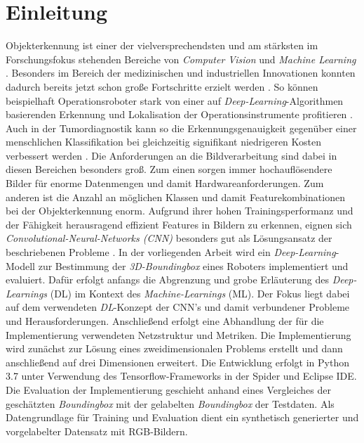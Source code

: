 \section{Einleitung}

Objekterkennung ist einer der vielversprechendsten und am stärksten im Forschungsfokus stehenden Bereiche von \textit{Computer Vision} und \textit{Machine Learning} \cite{Ouyang2014}. Besonders im Bereich der medizinischen und industriellen Innovationen konnten dadurch bereits jetzt schon große Fortschritte erzielt werden  \cite{Tremblay1809, Abstract2016}. So können beispielhaft Operationsroboter stark von einer auf \textit{Deep-Learning}-Algorithmen basierenden Erkennung und Lokalisation der Operationsinstrumente profitieren \cite{Surgery1803}. Auch in der Tumordiagnostik kann so die Erkennungsgenauigkeit gegenüber einer menschlichen Klassifikation bei gleichzeitig signifikant niedrigeren Kosten verbessert werden \cite{Cruz-Roa2017}.\newline
Die Anforderungen an die Bildverarbeitung sind dabei in diesen Bereichen besonders groß. Zum einen sorgen immer hochauflösendere Bilder für enorme Datenmengen und damit Hardwareanforderungen. Zum anderen ist die Anzahl an möglichen Klassen und damit Featurekombinationen bei der Objekterkennung enorm. Aufgrund ihrer hohen Trainingsperformanz und der Fähigkeit herausragend effizient Features in Bildern zu erkennen, eignen sich \textit{Convolutional-Neural-Networks (CNN)} besonders gut als Lösungsansatz der beschriebenen Probleme \cite{Ouyang2014}.\newline
In der vorliegenden Arbeit wird ein \textit{Deep-Learning}-Modell zur Bestimmung der \textit{3D-Boundingbox} eines Roboters implementiert und evaluiert.  Dafür erfolgt anfangs die Abgrenzung und grobe Erläuterung des \textit{Deep-Learnings} (DL) im Kontext des \textit{Machine-Learnings} (ML). Der Fokus liegt dabei auf dem verwendeten \textit{DL}-Konzept der CNN's und damit verbundener Probleme und Herausforderungen. Anschließend erfolgt eine Abhandlung der für die Implementierung verwendeten Netzstruktur und Metriken. Die Implementierung wird zunächst zur Lösung eines zweidimensionalen Problems erstellt und dann anschließend auf drei Dimensionen erweitert. Die Entwicklung erfolgt in Python 3.7 unter Verwendung des Tensorflow-Frameworks in der Spider und Eclipse IDE. Die Evaluation der Implementierung geschieht anhand eines Vergleiches der geschätzten \textit{Boundingbox} mit der gelabelten \textit{Boundingbox} der Testdaten. Als Datengrundlage für Training und Evaluation dient ein synthetisch generierter und vorgelabelter Datensatz mit RGB-Bildern.   